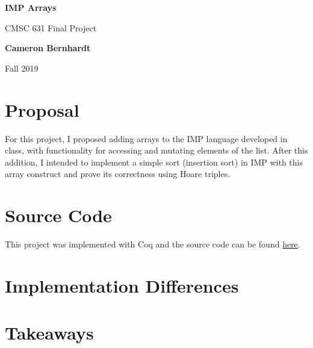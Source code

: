 \documentclass{article}
\begin{document}
    \begin{center}
        \vspace*{1cm}
        
        \Huge
        \textbf{IMP Arrays}
        
        \vspace{0.5cm}
        \LARGE
        CMSC 631 Final Project

        \vspace{1.5cm}

        \textbf{Cameron Bernhardt}

        \vfill

        Fall 2019
    \end{center}
    
    \newpage

    \section{Proposal}
    For this project, I proposed adding arrays to the IMP language developed in class, with functionality for accessing and mutating elements of the list. After this addition, I intended to implement a simple sort (insertion sort) in IMP with this array construct and prove its correctness using Hoare triples.

    \section{Source Code}
    This project was implemented with Coq and the source code can be found \href{https://github.com/AstroCB/IMP-Arrays}{here}.

    \section{Implementation Differences}

    \section{Takeaways}
\end{document}
